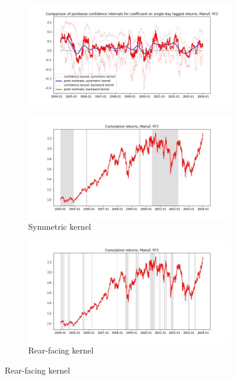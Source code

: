 \documentclass{article}
\begin{document}
\newpage

\begin{figure}

\centering

  \begin{subfigure}[b]{\textwidth}
    \includegraphics[width=\textwidth]{Manuf/pointwiseCIs_layered_FF3.jpg}
    \label{fig:1}
  \end{subfigure}
  \begin{subfigure}[b]{0.45\textwidth}
    \includegraphics[width=\textwidth]{Manuf/full_cumrets_ofint_FF3.jpg}
    \caption*{Symmetric kernel}
    \label{fig:2}
  \end{subfigure}
   \begin{subfigure}[b]{0.45\textwidth}
    \includegraphics[width=\textwidth]{Manuf/bwunif_full_cumrets_ofint_FF3.jpg}
    \caption*{Rear-facing kernel}
    \label{fig:2}
  \end{subfigure}
  
\end{figure}
\end{document}
